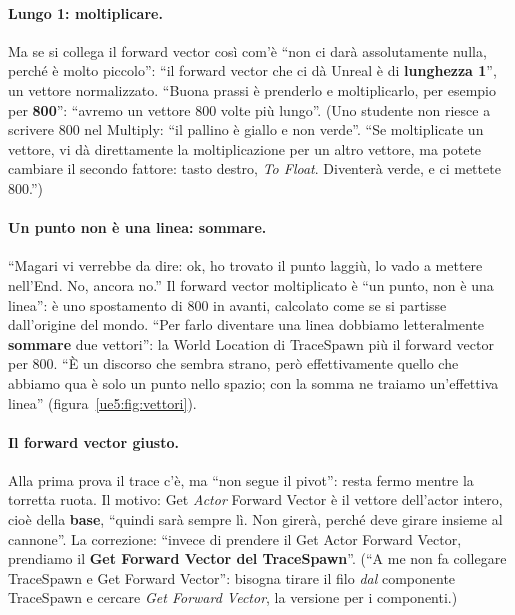 \paragraph{Lungo 1: moltiplicare.} Ma se si collega il forward vector così com'è ``non ci
darà assolutamente nulla, perché è molto piccolo'': ``il forward vector che ci dà Unreal
è di \textbf{lunghezza 1}'', un vettore normalizzato. ``Buona prassi è prenderlo e
moltiplicarlo, per esempio per \textbf{800}'': ``avremo un vettore 800 volte più
lungo''. (Uno studente non riesce a scrivere 800 nel Multiply: ``il pallino è giallo e
non verde''. ``Se moltiplicate un vettore, vi dà direttamente la moltiplicazione per un
altro vettore, ma potete cambiare il secondo fattore: tasto destro, \emph{To Float}.
Diventerà verde, e ci mettete 800.'')

\paragraph{Un punto non è una linea: sommare.} ``Magari vi verrebbe da dire: ok, ho
trovato il punto laggiù, lo vado a mettere nell'End. No, ancora no.'' Il forward vector
moltiplicato è ``un punto, non è una linea'': è uno spostamento di 800 in avanti,
calcolato come se si partisse dall'origine del mondo. ``Per farlo diventare una linea
dobbiamo letteralmente \textbf{sommare} due vettori'': la World Location di TraceSpawn
più il forward vector per 800. ``È un discorso che sembra strano, però effettivamente
quello che abbiamo qua è solo un punto nello spazio; con la somma ne traiamo un'effettiva
linea'' (figura~\ref{ue5:fig:vettori}).

\paragraph{Il forward vector giusto.} Alla prima prova il trace c'è, ma ``non segue il
pivot'': resta fermo mentre la torretta ruota. Il motivo: Get \emph{Actor} Forward
Vector è il vettore dell'actor intero, cioè della \textbf{base}, ``quindi sarà sempre lì.
Non girerà, perché deve girare insieme al cannone''. La correzione: ``invece di prendere
il Get Actor Forward Vector, prendiamo il \textbf{Get Forward Vector del TraceSpawn}''.
(``A me non fa collegare TraceSpawn e Get Forward Vector'': bisogna tirare il filo
\emph{dal} componente TraceSpawn e cercare \emph{Get Forward Vector}, la versione per i
componenti.)

